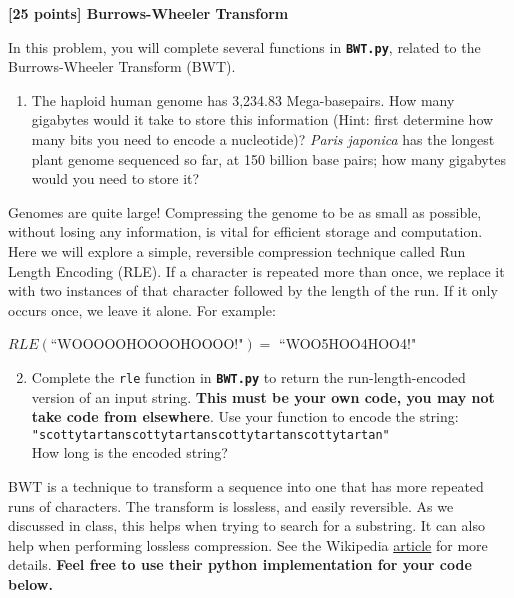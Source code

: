 {\bf [25 points] Burrows-Wheeler Transform}\\

\vspace{0.1in}

In this problem, you will complete several functions in \textbf{\texttt{BWT.py}}, related to the Burrows-Wheeler Transform (BWT).

\begin{enumerate}
    \item The haploid human genome has 3,234.83 Mega-basepairs. How many gigabytes would it take to store this information (Hint: first determine how many bits you need to encode a nucleotide)? \textit{Paris japonica} has the longest plant genome sequenced so far, at 150 billion base pairs; how many gigabytes would you need to store it?
\end{enumerate}

Genomes are quite large! Compressing the genome to be as small as possible, without losing any information, is vital for efficient storage and computation. Here we will explore a simple, reversible compression technique called Run Length Encoding (RLE). If a character is repeated more than once, we replace it with two instances of that character followed by the length of the run. If it only occurs once, we leave it alone. For example:

{
\begin{center}
    $RLE(\textrm{``WOOOOOHOOOOHOOOO!"}) = $ ``WOO5HOO4HOO4!"
\end{center}
}

\begin{enumerate}
  \setcounter{enumii}{1}
  \item \label{scottytartan} Complete the \texttt{rle} function in \textbf{\texttt{BWT.py}} to return the run-length-encoded version of an input string. \textbf{This must be your own code, you may not take code from elsewhere}. Use your function to encode the string:\\
  \texttt{"scottytartanscottytartanscottytartanscottytartan"}\\How long is the encoded string?
\end{enumerate}

BWT is a technique to transform a sequence into one that has more repeated runs of characters. The transform is lossless, and easily reversible. As we discussed in class, this helps when trying to search for a substring. It can also help when performing lossless compression. See the Wikipedia \href{https://en.wikipedia.org/wiki/Burrows–Wheeler_transform}{article} for more details. \textbf{Feel free to use their python implementation for your code below.}


